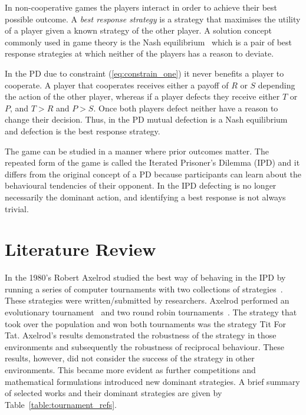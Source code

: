 In non-cooperative games the players interact in order to achieve their best 
possible outcome. A \textit{best response strategy} is a strategy
that maximises the utility of a player given a known strategy of the other
player. A solution concept commonly used in game theory is the Nash equilibrium~\cite{Nash1951}
which is a pair of best response strategies at which neither of the players has
a reason to deviate.

In the PD due to constraint (\ref{eq:constrain_one}) it never benefits a player
to cooperate. A player that cooperates receives either a payoff of \(R\) or \(S\)
depending the action of the other player, whereas if a player defects they
receive either \(T\) or \(P\), and \(T > R\) and \(P > S\). Once both
players defect neither have a reason to change their decision. Thus, in the
PD mutual defection is a Nash equilibrium and defection is the
best response strategy.

The game can be studied in a manner where prior outcomes matter. The repeated
form of the game is called the Iterated Prisoner's Dilemma (IPD) and it differs
from the original concept of a PD because participants can learn about the
behavioural tendencies of their opponent. In the IPD defecting is no
longer necessarily the dominant action, and identifying a best response is not
always trivial.

\section{Literature Review}\label{section:introduction_brief_literature}

In the 1980's Robert Axelrod studied the best way of behaving in the IPD by
running a series of computer tournaments with two collections of
strategies~\cite{Axelrod1984}. These strategies were written/submitted by
researchers. Axelrod performed an evolutionary tournament~\cite{Axelrod1981} and
two round robin tournaments~\cite{Axelrod1980a, Axelrod1980b}. The strategy that
took over the population and won both tournaments was the strategy Tit For Tat.
Axelrod's results demonstrated the robustness of the strategy in those
environments and subsequently the robustness of reciprocal behaviour. These
results, however, did not consider the success of the strategy in other
environments. This became more evident as further competitions and mathematical
formulations introduced new dominant strategies. A
brief summary of selected works and their dominant strategies are given by
Table~\ref{table:tournament_refs}.

